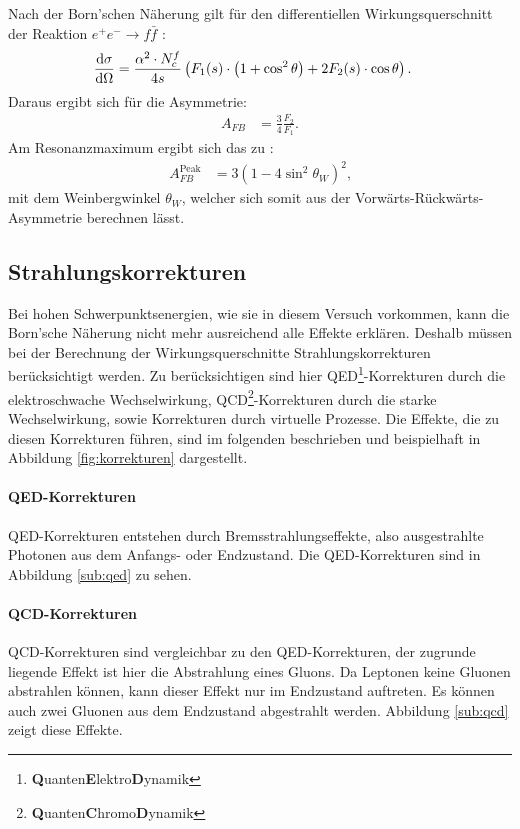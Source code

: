 Nach der Born'schen Näherung gilt für den differentiellen Wirkungsquerschnitt der Reaktion $e^+e^-\rightarrow f\bar f$ \cite{anleitungalt}:
\begin{align}
	\diff[\sigma]{\Omega}&=\frac{\alpha^2\cdot N_c^f}{4s}\left(F_1(s)\cdot\left(1+\cos^2\theta\right)+2F_2(s)\cdot\cos\theta\right)\text{.}
\end{align}
Daraus ergibt sich für die Asymmetrie:
\begin{align}
	A_{FB}&=\frac34\frac{F_2}{F_1}\text{.}
\end{align}
Am Resonanzmaximum ergibt sich das zu \cite{anleitungalt}:
\begin{align}
	A_{FB}^{\mathrm{Peak}}&=3\left(1-4\sin^2\theta_W\right)^2\text{,}\label{eq:weinberg}
\end{align}
mit dem Weinbergwinkel $\theta_W$, welcher sich somit aus der Vorwärts-Rückwärts-Asymmetrie berechnen lässt.

\subsection{Strahlungskorrekturen}
Bei hohen Schwerpunktsenergien, wie sie in diesem Versuch vorkommen, kann die Born'sche Näherung nicht mehr ausreichend alle Effekte erklären. Deshalb müssen bei der Berechnung der Wirkungsquerschnitte Strahlungskorrekturen berücksichtigt werden. Zu berücksichtigen sind hier QED\footnote{\textbf Quanten\textbf Elektro\textbf Dynamik}-Korrekturen durch die elektroschwache Wechselwirkung, QCD\footnote{\textbf Quanten\textbf Chromo\textbf Dynamik}-Korrekturen durch die starke Wechselwirkung, sowie Korrekturen durch virtuelle Prozesse. Die Effekte, die zu diesen Korrekturen führen, sind im folgenden beschrieben und beispielhaft in Abbildung \ref{fig:korrekturen} dargestellt. \cite{anleitungalt}

\paragraph{QED-Korrekturen}
QED-Korrekturen entstehen durch Bremsstrahlungseffekte, also ausgestrahlte Photonen aus dem Anfangs- oder Endzustand. Die QED-Korrekturen sind in Abbildung \ref{sub:qed} zu sehen.

\paragraph{QCD-Korrekturen}
QCD-Korrekturen sind vergleichbar zu den QED-Korrekturen, der zugrunde liegende Effekt ist hier die Abstrahlung eines Gluons. Da Leptonen keine Gluonen abstrahlen können, kann dieser Effekt nur im Endzustand auftreten. Es können auch zwei Gluonen aus dem Endzustand abgestrahlt werden. Abbildung \ref{sub:qcd} zeigt diese Effekte.

